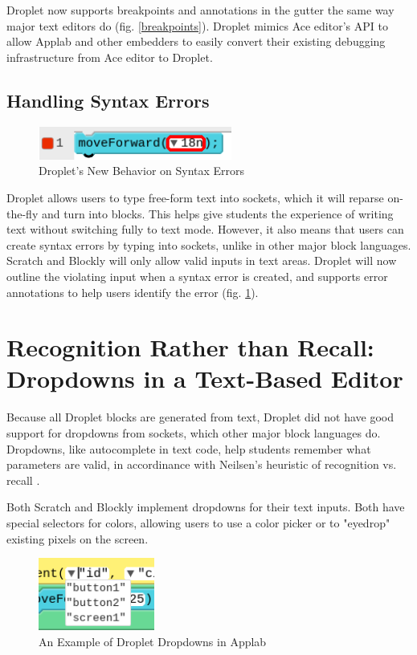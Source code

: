 \documentclass[conference]{IEEEtran}
\begin{document}
Droplet now supports breakpoints and annotations in the gutter the same way major text editors do (fig. \ref{breakpoints}). Droplet mimics Ace editor's API to allow Applab and other embedders to easily convert their existing debugging infrastructure from Ace editor to Droplet.

\subsection{Handling Syntax Errors}

\begin{figure}
\centering
\includegraphics[width=2.5in]{error-outline.png}
\caption{Droplet's New Behavior on Syntax Errors}
\label{error}
\end{figure}

Droplet allows users to type free-form text into sockets, which it will reparse on-the-fly and turn into blocks. This helps give students the experience of writing text without switching fully to text mode. However, it also means that users can create syntax errors by typing into sockets, unlike in other major block languages. Scratch and Blockly will only allow valid inputs in text areas. Droplet will now outline the violating input when a syntax error is created, and supports error annotations to help users identify the error (fig. \ref{error}).

\section{Recognition Rather than Recall: Dropdowns in a Text-Based Editor}

Because all Droplet blocks are generated from text, Droplet did not have good support for dropdowns from sockets, which other major block languages do. Dropdowns, like autocomplete in text code, help students remember what parameters are valid, in accordinance with Neilsen's heuristic of recognition vs. recall \cite{Neilsen}.

Both Scratch and Blockly implement dropdowns for their text inputs. Both have special selectors for colors, allowing users to use a color picker or to "eyedrop" existing pixels on the screen.

\begin{figure}
\centering
\includegraphics[width=1.5in]{dropdowns.png}
\caption{An Example of Droplet Dropdowns in Applab}
\label{dropdowns}
\end{figure}
\end{document}
